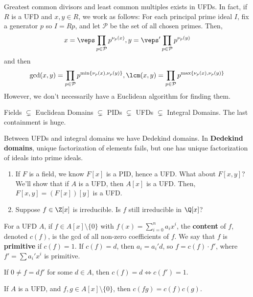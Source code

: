 \begin{rmk}
    Greatest common divisors and least common multiples exists in UFDs. In fact, if $R$ is a UFD and $x,y\in R$, we work as follows: For each principal prime ideal $I$, fix a generator $p$ so $I=Rp$, and let $\mathcal P $ be the set of all chosen primes. Then,
    $$x = \veps \prod _{p \in \mathcal P}p^{\nu_p(x)},y=\veps '\prod_{p \in \mathcal P}p^{\nu_p(y)}$$
    and then
    $$\gcd(x,y) = \prod _{p \in \mathcal P}p^{\min\{\nu _p(x),\nu _p(y)\}},\lcm (x,y) = \prod_{p \in \mathcal P}p^{\max \{\nu_p(x), \nu_p(y)\}}$$
    However, we don't necessarily have a Euclidean algorithm for finding them.
\end{rmk}

\begin{notebox*}
    Fields $\subsetneq$ Euclidean Domains $\subsetneq$ PIDs $\subsetneq$ UFDs $\subsetneq$ Integral Domains. The last containment is huge.
\end{notebox*}

Between UFDs and integral domains we have Dedekind domains. In \textbf{Dedekind domains}, unique factorization of elements fails, but one has unique factorization of ideals into prime ideals.

\begin{notebox*}
    \begin{enumerate}
        \item If $F$ is a field, we know $F[x]$ is a PID, hence a UFD. What about $F[x,y]$? We'll show that if $A$ is a UFD, then $A[x]$ is a UFD. Then, $F[x,y]=(F[x])[y]$ is a UFD.
        \item Suppose $f \in \Z[x]$ is irreducible. Is $f$ still irreducible in $\Q[x]$?
    \end{enumerate}
\end{notebox*}

\begin{defn}
    For a UFD $A$, if $f \in A[x]\setminus\{0\}$ with $f(x) = \sum _{i=0}^na_ix^i$, the \textbf{content} of $f$, denoted $c(f)$, is the gcd of all non-zero coefficients of $f$. We say that $f$ is \textbf{primitive} if $c(f)=1$. If $c(f)=d$, then $a_i=a_i'd$, so $f=c(f)\cdot f'$, where $f'=\sum a_i'x^i$ is primitive.

    If $0 \neq f = df'$ for some $d \in A$, then $c(f) =d \iff c(f')=1$.
\end{defn}

\begin{lem}
    If $A$ is a UFD, and $f,g \in A[x]\setminus\{0\}$, then $c(fg)=c(f)c(g)$.
\end{lem}

